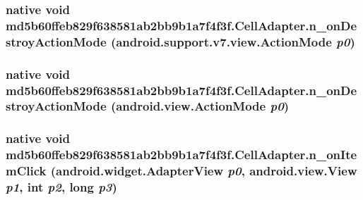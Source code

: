 \hypertarget{classmd5b60ffeb829f638581ab2bb9b1a7f4f3f_1_1_cell_adapter_ebfeb57150c2efac7eaeeb5271f7a5fa}{
\subsubsection[{n\_\-onDestroyActionMode}]{\setlength{\rightskip}{0pt plus 5cm}native void md5b60ffeb829f638581ab2bb9b1a7f4f3f.CellAdapter.n\_\-onDestroyActionMode (android.support.v7.view.ActionMode {\em p0})}}
\label{classmd5b60ffeb829f638581ab2bb9b1a7f4f3f_1_1_cell_adapter_ebfeb57150c2efac7eaeeb5271f7a5fa}


\hypertarget{classmd5b60ffeb829f638581ab2bb9b1a7f4f3f_1_1_cell_adapter_3dab8c32f57edad8c9c66d9944a5fcc2}{
\subsubsection[{n\_\-onDestroyActionMode}]{\setlength{\rightskip}{0pt plus 5cm}native void md5b60ffeb829f638581ab2bb9b1a7f4f3f.CellAdapter.n\_\-onDestroyActionMode (android.view.ActionMode {\em p0})}}
\label{classmd5b60ffeb829f638581ab2bb9b1a7f4f3f_1_1_cell_adapter_3dab8c32f57edad8c9c66d9944a5fcc2}


\hypertarget{classmd5b60ffeb829f638581ab2bb9b1a7f4f3f_1_1_cell_adapter_b7cc9e422e966560e28f28619fdbdb58}{
\subsubsection[{n\_\-onItemClick}]{\setlength{\rightskip}{0pt plus 5cm}native void md5b60ffeb829f638581ab2bb9b1a7f4f3f.CellAdapter.n\_\-onItemClick (android.widget.AdapterView {\em p0}, \/  android.view.View {\em p1}, \/  int {\em p2}, \/  long {\em p3})}}
\label{classmd5b60ffeb829f638581ab2bb9b1a7f4f3f_1_1_cell_adapter_b7cc9e422e966560e28f28619fdbdb58}


